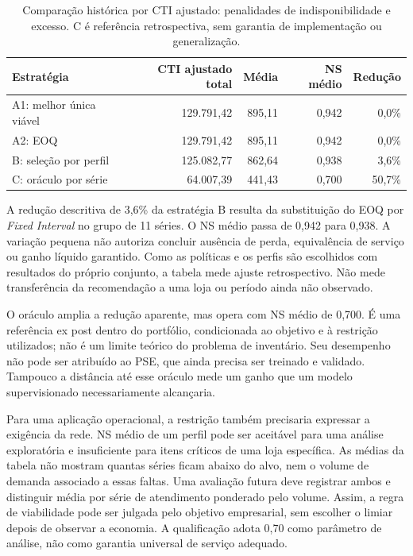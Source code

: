 \begin{table}[ht]
\centering\small
\caption{Comparação histórica por CTI ajustado: penalidades de indisponibilidade e excesso. C é referência retrospectiva, sem garantia de implementação ou generalização.}
\label{tab:strategy_cost_comparison}
\begin{tabular}{@{}lrrrr@{}}
\toprule
Estratégia & CTI ajustado total & Média & NS médio & Redução\\
\midrule
A1: melhor única viável &129.791,42&895,11&0,942&0,0\%\\
A2: EOQ &129.791,42&895,11&0,942&0,0\%\\
B: seleção por perfil &125.082,77&862,64&0,938&3,6\%\\
C: oráculo por série &64.007,39&441,43&0,700&50,7\%\\
\bottomrule
\end{tabular}
\end{table}

A redução descritiva de 3,6\% da estratégia B resulta da substituição do EOQ por \textit{Fixed Interval} no grupo de 11 séries. O NS médio passa de 0,942 para 0,938. A variação pequena não autoriza concluir ausência de perda, equivalência de serviço ou ganho líquido garantido. Como as políticas e os perfis são escolhidos com resultados do próprio conjunto, a tabela mede ajuste retrospectivo. Não mede transferência da recomendação a uma loja ou período ainda não observado.

O oráculo amplia a redução aparente, mas opera com NS médio de 0,700. É uma referência ex post dentro do portfólio, condicionada ao objetivo e à restrição utilizados; não é um limite teórico do problema de inventário. Seu desempenho não pode ser atribuído ao PSE, que ainda precisa ser treinado e validado. Tampouco a distância até esse oráculo mede um ganho que um modelo supervisionado necessariamente alcançaria.

Para uma aplicação operacional, a restrição também precisaria expressar a exigência da rede. NS médio de um perfil pode ser aceitável para uma análise exploratória e insuficiente para itens críticos de uma loja específica. As médias da tabela não mostram quantas séries ficam abaixo do alvo, nem o volume de demanda associado a essas faltas. Uma avaliação futura deve registrar ambos e distinguir média por série de atendimento ponderado pelo volume. Assim, a regra de viabilidade pode ser julgada pelo objetivo empresarial, sem escolher o limiar depois de observar a economia. A qualificação adota 0,70 como parâmetro de análise, não como garantia universal de serviço adequado.

